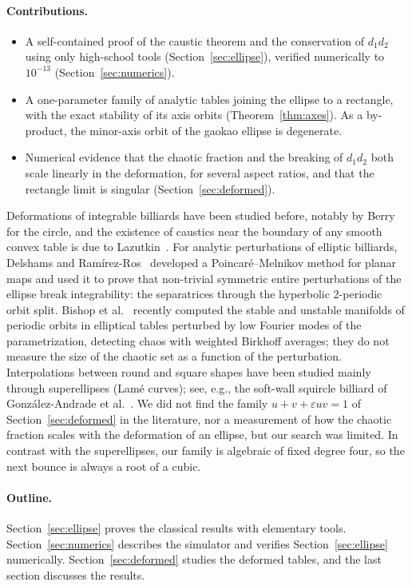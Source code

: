 \documentclass[11pt]{amsart}
\theoremstyle{remark}
\begin{document}
\paragraph{Contributions.}
\begin{itemize}
  \item A self-contained proof of the caustic theorem and the conservation of
  $d_1d_2$ using only high-school tools (Section~\ref{sec:ellipse}), verified
  numerically to $10^{-13}$ (Section~\ref{sec:numerics}).
  \item A one-parameter family of analytic tables joining the ellipse to a
  rectangle, with the exact stability of its axis orbits
  (Theorem~\ref{thm:axes}). As a by-product, the minor-axis orbit of the
  gaokao ellipse is degenerate.
  \item Numerical evidence that the chaotic fraction and the breaking of
  $d_1d_2$ both scale linearly in the deformation, for several aspect ratios,
  and that the rectangle limit is singular (Section~\ref{sec:deformed}).
\end{itemize}
Deformations of integrable billiards have been studied before, notably by
Berry~\cite{Berry1981} for the circle, and the existence of caustics near the
boundary of any smooth convex table is due to Lazutkin~\cite{Lazutkin1973}.
For analytic perturbations of elliptic billiards, Delshams and
Ram\'irez-Ros~\cite{DelshamsRamirezRos1996} developed a Poincar\'e--Melnikov
method for planar maps and used it to prove that non-trivial symmetric entire
perturbations of the ellipse break integrability: the separatrices through the
hyperbolic 2-periodic orbit split. Bishop et al.~\cite{Bishop2026} recently
computed the stable and unstable manifolds of periodic orbits in elliptical
tables perturbed by low Fourier modes of the parametrization, detecting chaos
with weighted Birkhoff averages; they do not measure the size of the chaotic
set as a function of the perturbation. Interpolations between round and square
shapes have been studied mainly through superellipses (Lam\'e curves); see,
e.g., the soft-wall squircle billiard of Gonz\'alez-Andrade et
al.~\cite{GonzalezAndrade2025}. We did not find the family
$u + v + \varepsilon uv = 1$ of Section~\ref{sec:deformed} in the literature,
nor a measurement of how the chaotic fraction scales with the deformation of
an ellipse, but our search was limited. In contrast with the superellipses,
our family is algebraic of fixed degree four, so the next bounce is always a
root of a cubic.

\paragraph{Outline.} Section~\ref{sec:ellipse} proves the classical results with
elementary tools. Section~\ref{sec:numerics} describes the simulator and
verifies Section~\ref{sec:ellipse} numerically. Section~\ref{sec:deformed}
studies the deformed tables, and the last section discusses the results.
\end{document}
